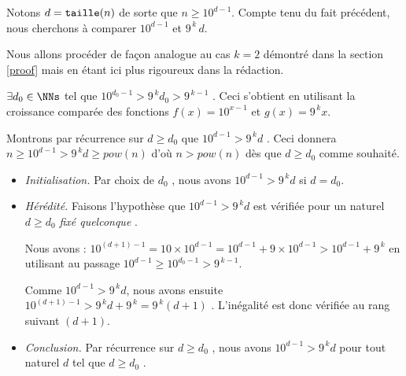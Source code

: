 \begin{proof*}\label{magicmajo-proof}
    Notons $d = \operatorname{\text{\normalfont\texttt{taille}}}(n)$ de sorte que $n \geqslant 10^{d-1}$.
    Compte tenu du fait précédent, nous cherchons à comparer $10^{d-1}$ et $9^{\,k} \, d$.


    \medskip

    Nous allons procéder de façon analogue au cas $k = 2$ démontré dans la section \ref{proof} mais en étant ici plus rigoureux dans la rédaction.


    \medskip

    $\exists d_0 \in \NNs$ tel que $10^{d_0 - 1} > 9^{\,k} d_0 > 9^{\,k  - 1}$ . Ceci s'obtient en utilisant la croissance comparée des fonctions $f(x) = 10^{x - 1}$ et $g(x) = 9^{\,k} x$.


    \medskip

    Montrons par récurrence sur $d \geqslant d_0$ que $10^{d - 1} > 9^{\,k} d$ .
    Ceci donnera $n \geqslant 10^{d - 1} > 9^{\,k} d \geqslant pow(n)$ d'où $n > pow(n)$ dès que $d \geqslant d_0$ comme souhaité.

    \begin{itemize}[label=\small\textbullet]
        \item \emph{Initialisation.}
        Par choix de $d_0$ , nous avons $10^{d-1} > 9^{\,k} d$ si $d = d_0$.

        \item \emph{Hérédité.}
        Faisons l'hypothèse que $10^{d-1} > 9^{\,k} d$ est vérifiée pour un naturel $d \geqslant d_0$ \emph{\og fixé quelconque \fg}.

        \smallskip

        \noindent
        Nous avons : $10^{(d+1)-1} = 10\times10^{d-1} = 10^{d-1} + 9\times10^{d-1} > 10^{d-1} + 9^{\,k}$
        en utilisant au passage $10^{d-1} \geqslant 10^{d_0-1} > 9^{\,k  - 1}$.

        \smallskip

        \noindent
        Comme $10^{d-1} > 9^{\,k} d$, nous avons ensuite $10^{(d+1)-1} > 9^{\,k} d + 9^{\,k} = 9^{\,k} (d+ 1)$ .
        L'inégalité est donc vérifiée au rang suivant $(d+1)$.

        \item \emph{Conclusion.}
        Par récurrence sur $d \geqslant d_0$ , nous avons $10^{d - 1} > 9^{\,k} d$ pour tout naturel $d$ tel que $d \geqslant d_0$ .
    \end{itemize}
\end{proof*}


\medskip

